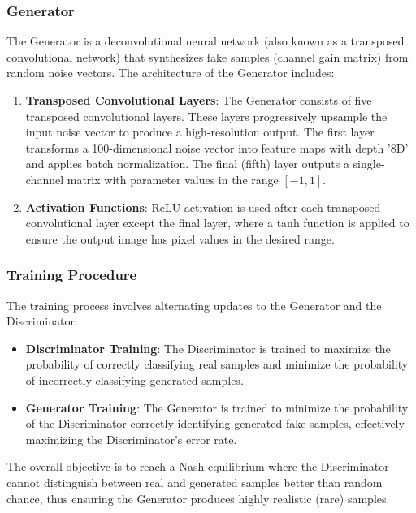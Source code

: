 \documentclass[letterpaper%
, twoside%
, 12pt%
,memoire%
, english%
,creativecommons,hyperref, withAlgo2e %
]{thETS}
\numberwithin{algorithm}{chapter}
\begin{document}
\subsubsection{Generator}



The Generator is a deconvolutional neural network (also known as a transposed convolutional network) that synthesizes fake samples (channel gain matrix) from random noise vectors. The architecture of the Generator includes:

\begin{enumerate}
    \item \textbf{Transposed Convolutional Layers}: The Generator consists of five transposed convolutional layers. These layers progressively upsample the input noise vector to produce a high-resolution output. The first layer transforms a 100-dimensional noise vector into feature maps with depth '8D' and applies batch normalization. The final (fifth) layer outputs a single-channel matrix with parameter values in the range \([-1, 1]\).
    \item \textbf{Activation Functions}: ReLU activation is used after each transposed convolutional layer except the final layer, where a tanh function is applied to ensure the output image has pixel values in the desired range.
\end{enumerate}






\subsubsection{Training Procedure}

The training process involves alternating updates to the Generator and the Discriminator:

\begin{itemize}
    \item \textbf{Discriminator Training}: The Discriminator is trained to maximize the probability of correctly classifying real samples and minimize the probability of incorrectly classifying generated samples.
    \item \textbf{Generator Training}: The Generator is trained to minimize the probability of the Discriminator correctly identifying generated fake samples, effectively maximizing the Discriminator's error rate.
\end{itemize}

The overall objective is to reach a Nash equilibrium where the Discriminator cannot distinguish between real and generated samples better than random chance, thus ensuring the Generator produces highly realistic (rare) samples.
\end{document}
